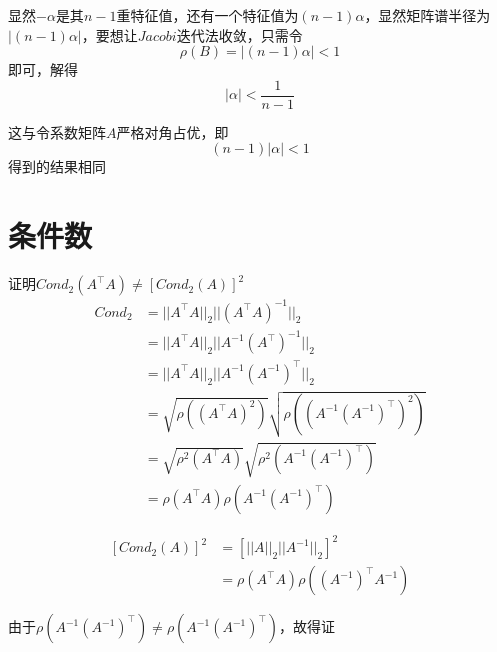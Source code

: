 \documentclass{article}
\begin{document}
\begin{CJK*}{UTF8}{gbsn}
显然$-\alpha$是其$n - 1$重特征值，还有一个特征值为$(n - 1)\alpha$，显然矩阵谱半径为$|(n - 1)\alpha|$，要想让$Jacobi$迭代法收敛，只需令
\[ \rho(B) = |(n - 1)\alpha| < 1 \]
即可，解得
\[ |\alpha| < \frac{1}{n - 1} \]

这与令系数矩阵$A$严格对角占优，即
\[ (n - 1)|\alpha| < 1 \]
得到的结果相同

\section{条件数}
证明$Cond_2(A^\top A) \neq [Cond_2(A)]^2$
\[
\begin{aligned}
Cond_2
&= ||A^\top A||_2||(A^\top A)^{-1}||_2 \\
&= ||A^\top A||_2||A^{-1}(A^\top)^{-1}||_2 \\
&= ||A^\top A||_2||A^{-1}(A^{-1})^\top||_2 \\
&= \sqrt{\rho((A^\top A)^2)}\sqrt{\rho((A^{-1}(A^{-1})^\top)^2)} \\
&= \sqrt{\rho^2(A^\top A)}\sqrt{\rho^2(A^{-1}(A^{-1})^\top)} \\
&= \rho(A^\top A)\rho(A^{-1}(A^{-1})^\top)
\end{aligned}
\]

\[
\begin{aligned}
\left[Cond_2(A)\right]^2
&= [||A||_2||A^{-1}||_2]^2 \\
&= \rho(A^\top A)\rho((A^{-1})^\top A^{-1})
\end{aligned}
\]

由于$\rho(A^{-1}(A^{-1})^\top) \neq \rho(A^{-1}(A^{-1})^\top)$，故得证

\end{CJK*}
\end{document}
